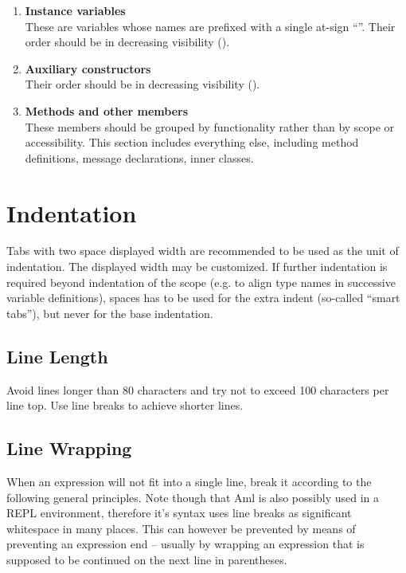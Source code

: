 \begin{enumerate}
\item {\bfseries Instance variables} \hfill \\
These are variables whose names are prefixed with a single at-sign ``''. Their order should be in decreasing visibility ().

\item {\bfseries Auxiliary constructors} \hfill \\
Their order should be in decreasing visibility ().

\item {\bfseries Methods and other members} \hfill \\
These members should be grouped by functionality rather than by scope or accessibility. This section includes everything else, including method definitions, message declarations, inner classes. 
\end{enumerate}





\section{Indentation}

Tabs with two space displayed width are recommended to be used as the unit of indentation. The displayed width may be customized. If further indentation is required beyond indentation of the scope (e.g. to align type names in successive variable definitions), spaces has to be used for the extra indent (so-called ``smart tabs''), but never for the base indentation. 





\subsection{Line Length}

Avoid lines longer than 80 characters and try not to exceed 100 characters per line top. Use line breaks to achieve shorter lines. 






\subsection{Line Wrapping}

When an expression will not fit into a single line, break it according to the following general principles. Note though that Aml is also possibly used in a REPL environment, therefore it's syntax uses line breaks as significant whitespace in many places. This can however be prevented by means of preventing an expression end -- usually by wrapping an expression that is supposed to be continued on the next line in parentheses. 

